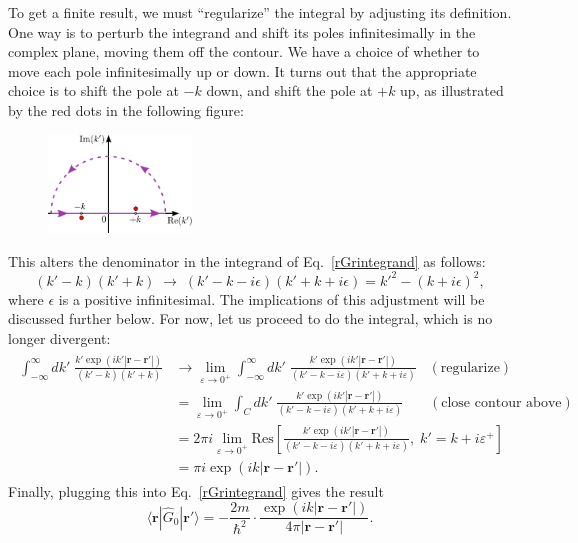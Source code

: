 \documentclass[pra,12pt]{revtex4-2}
\begin{document}
To get a finite result, we must ``regularize'' the integral by
adjusting its definition.  One way is to perturb the integrand and
shift its poles infinitesimally in the complex plane, moving them off
the contour.  We have a choice of whether to move each pole
infinitesimally up or down.  It turns out that the appropriate choice
is to shift the pole at $-k$ down, and shift the pole at $+k$ up, as
illustrated by the red dots in the following figure:

\begin{figure}[h!]
  \centering\includegraphics[width=0.34\textwidth]{greencontour}
\end{figure}

\noindent
This alters the denominator in the integrand of
Eq.~\eqref{rGrintegrand} as follows:
\begin{equation}
  (k' - k)(k'+k) \;\rightarrow\; (k' - k - i\epsilon)(k'+k+i\epsilon) = {k'}^2 - (k+i\epsilon)^2,
  \label{kregularization}
\end{equation}
where $\epsilon$ is a positive infinitesimal.  The implications of
this adjustment will be discussed further below.  For now, let us
proceed to do the integral, which is no longer divergent:
\begin{align*}
  \begin{aligned}\int_{-\infty}^\infty dk' \; \frac{\displaystyle k' \exp\left(ik'|\mathbf{r}-\mathbf{r}'|\right)}{(k' - k)(k'+k)} &\rightarrow \lim_{\varepsilon \rightarrow 0^+} \int_{-\infty}^\infty dk' \; \frac{\displaystyle k' \exp\left(ik'|\mathbf{r}-\mathbf{r}'|\right)}{(k' - k - i\varepsilon)(k'+k+i\varepsilon)}\;\;\; (\text{regularize}) \\ &= \lim_{\varepsilon \rightarrow 0^+} \int_C dk' \; \frac{\displaystyle k' \exp\left(ik'|\mathbf{r}-\mathbf{r}'|\right)}{(k' - k - i\varepsilon)(k'+k+i\varepsilon)} \quad\;\;\; (\text{close contour above}) \\ &= 2\pi i \lim_{\varepsilon \rightarrow 0^+} \mathrm{Res}\left[\frac{\displaystyle k' \exp\left(ik'|\mathbf{r}-\mathbf{r}'|\right)}{(k' - k - i\varepsilon)(k'+k+i\varepsilon)}, \;k'=k+i\varepsilon^+\right] \\ &= \pi i \exp\left(ik|\mathbf{r}-\mathbf{r}'|\right).\end{aligned}
\end{align*}
Finally, plugging this into Eq.~\eqref{rGrintegrand} gives the result
\begin{equation}
  \langle\mathbf{r}|\hat{G}_0|\mathbf{r}'\rangle = -\frac{2m}{\hbar^2}
  \cdot \frac{\exp\left(ik|\mathbf{r}-\mathbf{r}'|\right)}{4\pi|\mathbf{r}-\mathbf{r}'|}.
  \label{3dprop}
\end{equation}
\end{document}

